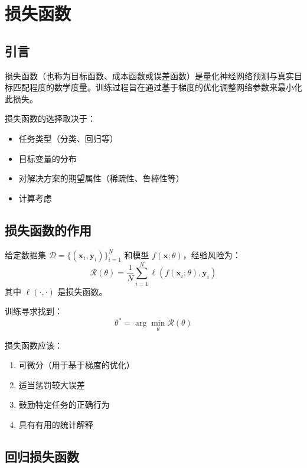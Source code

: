 \clearpage
\cleardoublepage

\chapter{损失函数}

\section{引言}

损失函数（也称为目标函数、成本函数或误差函数）是量化神经网络预测与真实目标匹配程度的数学度量。训练过程旨在通过基于梯度的优化调整网络参数来最小化此损失。

损失函数的选择取决于：
\begin{itemize}
    \item 任务类型（分类、回归等）
    \item 目标变量的分布
    \item 对解决方案的期望属性（稀疏性、鲁棒性等）
    \item 计算考虑
\end{itemize}

\section{损失函数的作用}

给定数据集 $\mathcal{D} = \{(\mathbf{x}_i, \mathbf{y}_i)\}_{i=1}^{N}$ 和模型 $f(\mathbf{x}; \theta)$，经验风险为：
\begin{equation}
\mathcal{R}(\theta) = \frac{1}{N}\sum_{i=1}^{N} \ell(f(\mathbf{x}_i; \theta), \mathbf{y}_i)
\end{equation}
其中 $\ell(\cdot, \cdot)$ 是损失函数。

训练寻求找到：
\begin{equation}
\theta^* = \arg\min_{\theta} \mathcal{R}(\theta)
\end{equation}

损失函数应该：
\begin{enumerate}
    \item 可微分（用于基于梯度的优化）
    \item 适当惩罚较大误差
    \item 鼓励特定任务的正确行为
    \item 具有有用的统计解释
\end{enumerate}

\section{回归损失函数}

